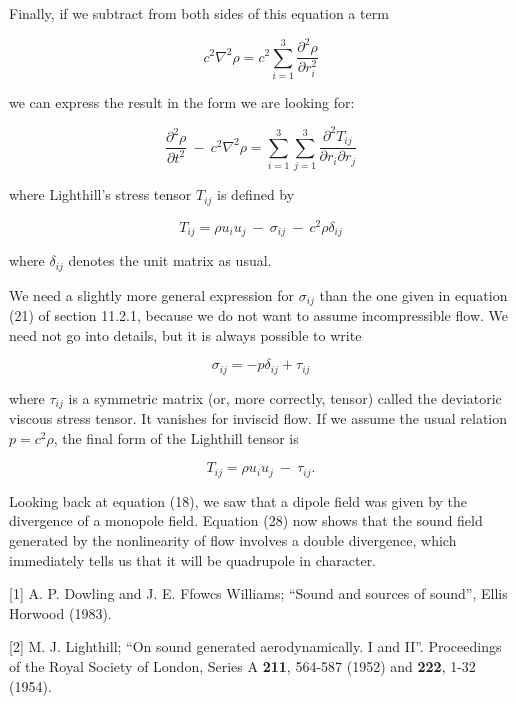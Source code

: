   Finally, if we subtract from both sides of this equation a term 

  \begin{equation*}c^2 \nabla^2 \rho = c^2 \sum_{i=1}^3 \dfrac{\partial^2 
  \rho}{\partial r_i^2} \tag{27}\end{equation*} 

  \noindent{}we can express the result in the form we are looking for: 

  \begin{equation*}\dfrac{\partial^2 \rho}{\partial t^2} \mathrm{~}-\mathrm{~} 
  c^2 \nabla^2 \rho = \sum_{i=1}^3 \sum_{j=1}^3 \dfrac{\partial^2 
  T_{ij}}{\partial r_i \partial r_j} \tag{28}\end{equation*} 

  \noindent{}where Lighthill's stress tensor $T_{ij}$ is defined by 

  \begin{equation*}T_{ij} = \rho u_i u_j \mathrm{~}-\mathrm{~} \sigma_{ij} 
  \mathrm{~}-\mathrm{~} c^2 \rho \delta_{ij} \tag{29}\end{equation*} 

  \noindent{}where $\delta_{ij}$ denotes the unit matrix as usual. 

  We need a slightly more general expression for $\sigma_{ij}$ than the one 
  given in equation (21) of section 11.2.1, because we do not want to assume 
  incompressible flow. We need not go into details, but it is always possible 
  to write 

  \begin{equation*}\sigma_{ij} = -p \delta_{ij} + \tau_{ij} 
  \tag{30}\end{equation*} 

  \noindent{}where $\tau_{ij}$ is a symmetric matrix (or, more correctly, 
  tensor) called the deviatoric viscous stress tensor. It vanishes for inviscid 
  flow. If we assume the usual relation $p=c^2 \rho$, the final form of the 
  Lighthill tensor is 

  \begin{equation*}T_{ij} = \rho u_i u_j \mathrm{~}-\mathrm{~} \tau_{ij} . 
  \tag{31}\end{equation*} 

  Looking back at equation (18), we saw that a dipole field was given by the 
  divergence of a monopole field. Equation (28) now shows that the sound field 
  generated by the nonlinearity of flow involves a double divergence, which 
  immediately tells us that it will be quadrupole in character. 

  \sectionreferences{}[1] A. P. Dowling and J. E. Ffowcs Williams; “Sound and 
  sources of sound”, Ellis Horwood (1983). 

  [2] M. J. Lighthill; “On sound generated aerodynamically. I and II”. 
  Proceedings of the Royal Society of London, Series A \textbf{211}, 564-587 
  (1952) and \textbf{222}, 1-32 (1954). 